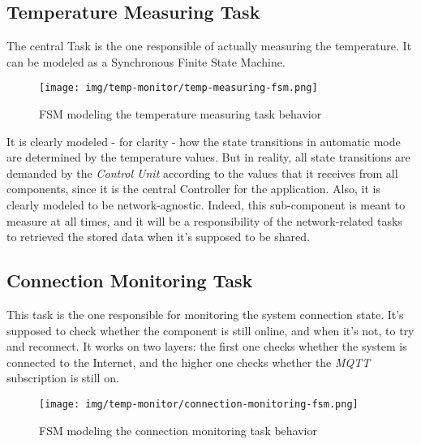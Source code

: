 \documentclass[a4paper,12pt]{report}
\begin{document}
		\subsection{Temperature Measuring Task}
		The central Task is the one responsible of actually measuring the temperature. It can be modeled as a Synchronous Finite State Machine.
		\begin{figure}[H]
			\centering{}
			\texttt{[image: img/temp-monitor/temp-measuring-fsm.png]}
			\caption{FSM modeling the temperature measuring task behavior}
			\label{img:temp-monitor/temp-measuring-fsm}
		\end{figure}
		It is clearly modeled - for clarity - how the state transitions in automatic mode are determined by the temperature values. But in reality, all state transitions are demanded by the \textit{Control Unit} according to the values that it receives from all components, since it is the central Controller for the application.
		\newline Also, it is clearly modeled to be network-agnostic. Indeed, this sub-component is meant to measure at all times, and it will be a responsibility of the network-related tasks to retrieved the stored data when it's supposed to be shared.
		\subsection{Connection Monitoring Task}
		This task is the one responsible for monitoring the system connection state. It's supposed to check whether the component is still online, and when it's not, to try and reconnect. It works on two layers: the first one checks whether the system is connected to the Internet, and the higher one checks whether the \textit{MQTT} subscription is still on.
		\begin{figure}[H]
			\centering{}
			\texttt{[image: img/temp-monitor/connection-monitoring-fsm.png]}
			\caption{FSM modeling the connection monitoring task behavior}
			\label{img:temp-monitor/connection-monitoring-fsm}
		\end{figure}
\end{document}
